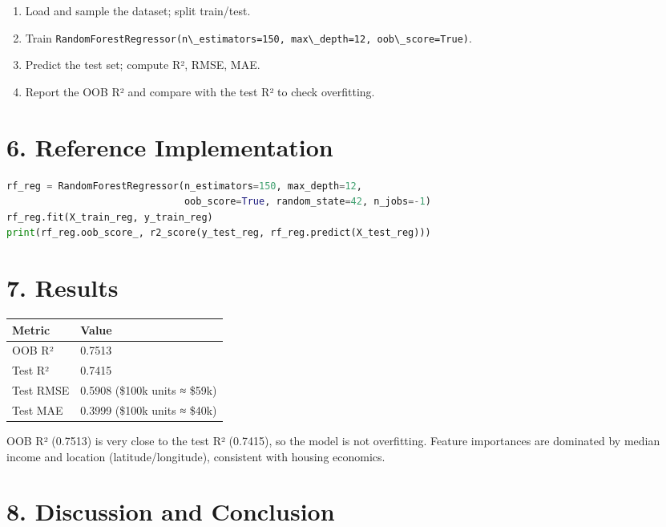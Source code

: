 \begin{enumerate}
\def\labelenumi{\arabic{enumi}.}
\tightlist
\item
  Load and sample the dataset; split train/test.
\item
  Train
  \passthrough{\lstinline!RandomForestRegressor(n\_estimators=150, max\_depth=12, oob\_score=True)!}.
\item
  Predict the test set; compute R², RMSE, MAE.
\item
  Report the OOB R² and compare with the test R² to check overfitting.
\end{enumerate}

\section{6. Reference Implementation}\label{reference-implementation}

\begin{lstlisting}[language=Python]
rf_reg = RandomForestRegressor(n_estimators=150, max_depth=12,
                               oob_score=True, random_state=42, n_jobs=-1)
rf_reg.fit(X_train_reg, y_train_reg)
print(rf_reg.oob_score_, r2_score(y_test_reg, rf_reg.predict(X_test_reg)))
\end{lstlisting}

\section{7. Results}\label{results}

{\def\LTcaptype{none} %
\begin{longtable}[]{@{}ll@{}}
\toprule\noalign{}
Metric & Value \\
\midrule\noalign{}
\endhead
\bottomrule\noalign{}
\endlastfoot
OOB R² & 0.7513 \\
Test R² & 0.7415 \\
Test RMSE & 0.5908 (\$100k units ≈ \$59k) \\
Test MAE & 0.3999 (\$100k units ≈ \$40k) \\
\end{longtable}
}

OOB R² (0.7513) is very close to the test R² (0.7415), so the model is
not overfitting. Feature importances are dominated by median income and
location (latitude/longitude), consistent with housing economics.

\section{8. Discussion and Conclusion}\label{discussion-and-conclusion}

